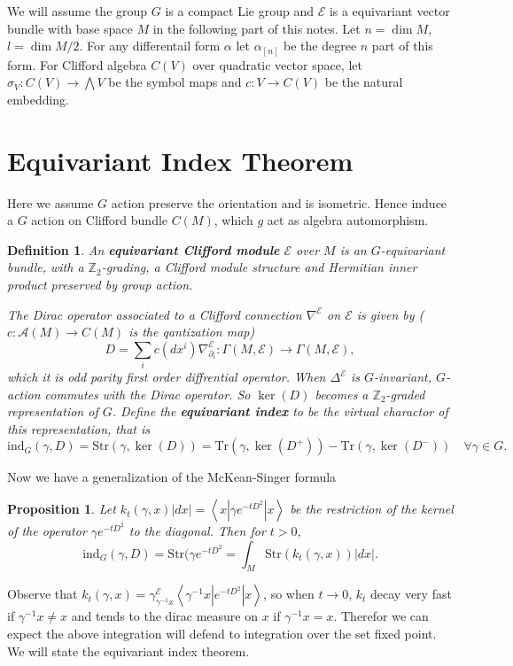 \documentclass[11pt]{amsart}
\newtheorem{Prop}[Thm]{Proposition}
\newtheorem{Def}[Thm]{Definition}
\def\cA{{\mathcal{A}}}
\def\cE{{\mathcal{E}}}
\def\bZ{{\mathbb{Z}}}
\def\bZ{{\mathbb{Z}}}
\def\Str{{\mathrm{Str}}}
\def\kw#1{{\bf \em #1}}
\def\brk#1{\left<{#1}\right>}
\def\ind{\mathrm{ind}}
\def\Tr{\mathrm{Tr}}
\begin{document}
We will assume the group $G$ is a compact Lie group and $\cE$ is a
equivariant vector bundle with base space $M$ in the following part
of this notes. Let $n=\dim M$, $l = \dim M/2$.
For any differentail form $\alpha$ let $\alpha_{[n]}$ be the degree
$n$ part of this form. For Clifford algebra $C(V)$ over quadratic vector space,
let $\sigma_V\colon C(V) \to \bigwedge V$ be the symbol maps and 
$c \colon V \to C(V)$ be the natural embedding.

\section{Equivariant Index Theorem}
\label{Sec:fix}
Here we assume $G$ action preserve the orientation and is isometric.
Hence induce a $G$ action on Clifford bundle $C(M)$, which $g$ act as algebra
automorphism. 

\begin{Def}
An \kw{equivariant Clifford module} $\cE$ over $M$ 
is an $G$-equivariant bundle, with a $\bZ_2$-grading, 
a Clifford module structure 
and Hermitian inner product preserved by group action.

The Dirac operator associated to a Clifford connection $\nabla^\cE$ on $\cE$
is given by ($c\colon \cA(M) \to C(M)$ is the qantization map)
\[
D = \sum_i c(dx^i)\nabla^\cE_{\partial_i}\colon \Gamma(M,\cE) \to \Gamma(M,\cE),
\]
which it is odd parity first order diffrential operator.
When $\Delta^\cE$ is $G$-invariant, $G$-action commutes with the Dirac operator.
So $\ker(D)$ becomes a $\bZ_2$-graded representation of $G$.
Define the \kw{equivariant index} to be the virtual charactor of this representation, that is 
\[
\ind_G(\gamma, D) = \Str(\gamma, \ker(D)) 
= \Tr(\gamma,\ker(D^+)) - \Tr(\gamma,\ker(D^-))\quad \forall \gamma\in G.
\]
\end{Def}

Now we have a generalization of the McKean-Singer formula
\begin{Prop}
Let $k_t(\gamma, x)|dx|=\brk{x|\gamma e^{-tD^2}|x}$ be the restriction of the
kernel of the operator $\gamma e^{-tD^2}$ to the 
diagonal. Then for $t>0$, 
\[
\ind_G(\gamma,D) = \Str(\gamma e^{-tD^2} = \int_M \Str(k_t(\gamma,x))|dx|.
\]
\end{Prop}

Observe that $k_t(\gamma,x) = \gamma^\cE_{\gamma^{-1}x}\brk{\gamma^{-1}x|e^{-tD^2}|x}$,
so when $t\to 0$, $k_t$ decay very fast if $\gamma^{-1}x \neq x$ and 
tends to the dirac measure on $x$ if $\gamma^{-1}x=x$.
Therefor we can expect the above integration will defend to integration
over the set fixed point. We will state the equivariant index theorem.
\end{document}
